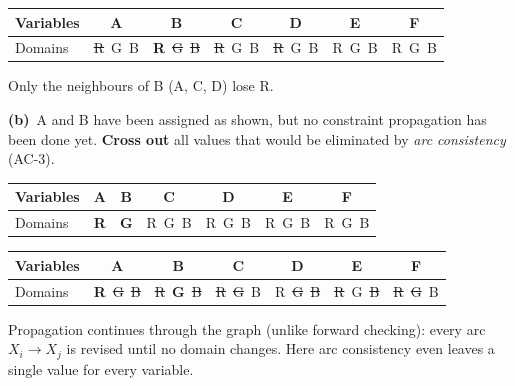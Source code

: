 \documentclass[11pt,a4paper]{article}
\newcommand{\subq}[1]{\par\smallskip\noindent\textbf{#1}\ }
\begin{document}
\begin{solbox}
\begin{center}\small\begin{tabular}{|l|c|c|c|c|c|c|}\hline Variables & \textbf{A} & \textbf{B} & \textbf{C} & \textbf{D} & \textbf{E} & \textbf{F}\\ \hline Domains & \textcolor{red!70!black}{\sout{R}}\ G\ B & \textbf{R}\ \textcolor{red!70!black}{\sout{G}}\ \textcolor{red!70!black}{\sout{B}} & \textcolor{red!70!black}{\sout{R}}\ G\ B & \textcolor{red!70!black}{\sout{R}}\ G\ B & R\ G\ B & R\ G\ B\\ \hline\end{tabular}\end{center}Only the neighbours of B (A, C, D) lose R.
\end{solbox}
\subq{(b)}A and B have been assigned as shown, but no constraint propagation has been done yet. \textbf{Cross out} all values that would be eliminated by \emph{arc consistency} (AC-3).\begin{center}\small\begin{tabular}{|l|c|c|c|c|c|c|}\hline Variables & \textbf{A} & \textbf{B} & \textbf{C} & \textbf{D} & \textbf{E} & \textbf{F}\\ \hline Domains & \textbf{R} & \textbf{G} & R\ G\ B & R\ G\ B & R\ G\ B & R\ G\ B\\ \hline\end{tabular}\end{center}
\begin{solbox}
\begin{center}\small\begin{tabular}{|l|c|c|c|c|c|c|}\hline Variables & \textbf{A} & \textbf{B} & \textbf{C} & \textbf{D} & \textbf{E} & \textbf{F}\\ \hline Domains & \textbf{R}\ \textcolor{red!70!black}{\sout{G}}\ \textcolor{red!70!black}{\sout{B}} & \textcolor{red!70!black}{\sout{R}}\ \textbf{G}\ \textcolor{red!70!black}{\sout{B}} & \textcolor{red!70!black}{\sout{R}}\ \textcolor{red!70!black}{\sout{G}}\ B & R\ \textcolor{red!70!black}{\sout{G}}\ \textcolor{red!70!black}{\sout{B}} & \textcolor{red!70!black}{\sout{R}}\ G\ \textcolor{red!70!black}{\sout{B}} & \textcolor{red!70!black}{\sout{R}}\ \textcolor{red!70!black}{\sout{G}}\ B\\ \hline\end{tabular}\end{center}Propagation continues through the graph (unlike forward checking): every arc $X_i\to X_j$ is revised until no domain changes. Here arc consistency even leaves a single value for every variable.
\end{solbox}
\end{document}
